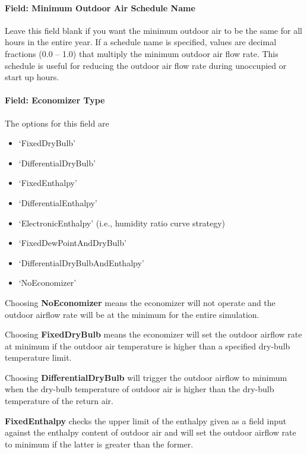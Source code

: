 \paragraph{Field: Minimum Outdoor Air Schedule Name}\label{field-minimum-outdoor-air-schedule-name-2}

Leave this field blank if you want the minimum outdoor air to be the same for all hours in the entire year. If a schedule name is specified, values are decimal fractions (0.0 -- 1.0) that multiply the minimum outdoor air flow rate. This schedule is useful for reducing the outdoor air flow rate during unoccupied or start up hours.

\paragraph{Field: Economizer Type}\label{field-economizer-type-2}

The options for this field are

\begin{itemize}
\item
  `FixedDryBulb'
\item
  `DifferentialDryBulb'
\item
  `FixedEnthalpy'
\item
  `DifferentialEnthalpy'
\item
  `ElectronicEnthalpy' (i.e., humidity ratio curve strategy)
\item
  `FixedDewPointAndDryBulb'
\item
  `DifferentialDryBulbAndEnthalpy'
\item
  `NoEconomizer'
\end{itemize}

Choosing \textbf{NoEconomizer} means the economizer will not operate and the outdoor airflow rate will be at the minimum for the entire simulation.

Choosing \textbf{FixedDryBulb} means the economizer will set the outdoor airflow rate at minimum if the outdoor air temperature is higher than a specified dry-bulb temperature limit.

Choosing \textbf{DifferentialDryBulb} will trigger the outdoor airflow to minimum when the dry-bulb temperature of outdoor air is higher than the dry-bulb temperature of the return air.

\textbf{FixedEnthalpy} checks the upper limit of the enthalpy given as a field input against the enthalpy content of outdoor air and will set the outdoor airflow rate to minimum if the latter is greater than the former.

